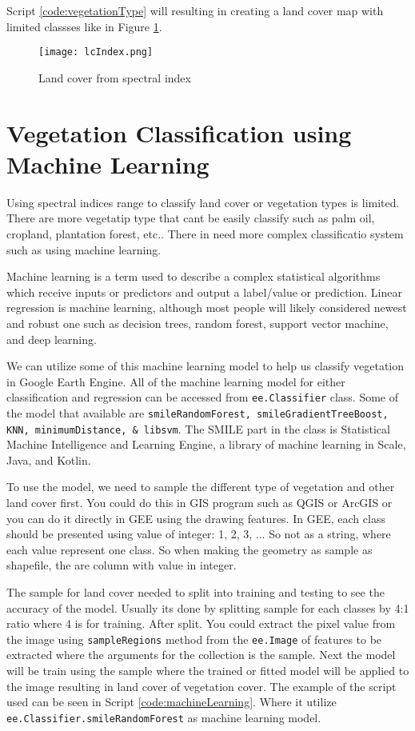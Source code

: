 Script \ref{code:vegetationType} will resulting in creating a land cover map with limited classses like in Figure \ref{fig:lcIndex}.

\begin{figure}[htbp]
	\label{fig:lcIndex}
	\centering
	\texttt{[image: lcIndex.png]}
	\caption{Land cover from spectral index}
\end{figure}

\section{Vegetation Classification using Machine Learning}
Using spectral indices range to classify land cover or vegetation types is limited. There are more vegetatip type that cant be easily classify such as palm oil, cropland, plantation forest, etc.. There in need more complex classificatio system such as using machine learning.

Machine learning is a term used to describe a complex statistical algorithms which receive inputs or predictors and output a label/value or prediction. Linear regression is machine learning, although most people will likely considered newest and robust one such as decision trees, random forest, support vector machine, and deep learning.

We can utilize some of this machine learning model to help us classify vegetation in Google Earth Engine. All of the machine learning model for either classification and regression can be accessed from \verb|ee.Classifier| class. Some of the model that available are \verb|smileRandomForest, smileGradientTreeBoost, KNN, minimumDistance, & libsvm|. The SMILE part in the class is Statistical Machine Intelligence and Learning Engine, a library of machine learning in Scale, Java, and Kotlin.

To use the model, we need to sample the different type of vegetation and other land cover first. You could do this in GIS program such as QGIS or ArcGIS or you can do it directly in GEE using the drawing features. In GEE, each class should be presented using value of integer: 1, 2, 3, ... So not as a string, where each value represent one class. So when making the geometry as sample as shapefile, the are column with value in integer.

The sample for land cover needed to split into training and testing to see the accuracy of the model. Usually its done by splitting sample for each classes by 4:1 ratio where 4 is for training. After split. You could extract the pixel value from the image using \verb|sampleRegions| method from the \verb|ee.Image| of features to be extracted where the arguments for the collection is the sample. Next the model will be train using the sample where the trained or fitted model will be applied to the image resulting in land cover of vegetation cover. The example of the script used can be seen in Script \ref{code:machineLearning}. Where it utilize \verb|ee.Classifier.smileRandomForest| as machine learning model.

